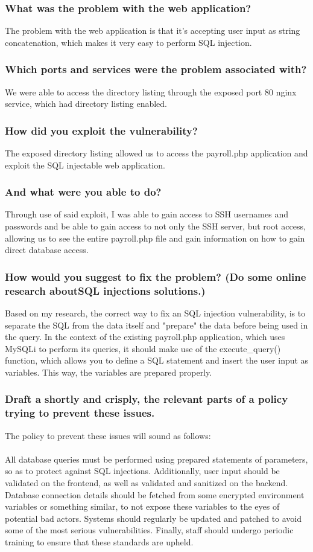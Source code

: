 \subsubsection{What was the problem with the web application?}
The problem with the web application is that it's accepting user input as string concatenation, which makes it very easy to perform SQL injection.
\subsubsection{Which ports and services were the problem associated with?}
We were able to access the directory listing through the exposed port 80 nginx service, which had directory listing enabled.
\subsubsection{How did you exploit the vulnerability?}
The exposed directory listing allowed us to access the payroll.php application and exploit the SQL injectable web application.
\subsubsection{And what were you able to do?}
Through use of said exploit, I was able to gain access to SSH usernames and passwords and be able to gain access to not only the SSH server, but root access, allowing us to see the entire payroll.php file and gain information on how to gain direct database access.
\subsubsection{How would you suggest to fix the problem? (Do some online research aboutSQL injections solutions.)}
Based on my research, the correct way to fix an SQL injection vulnerability, is to separate the SQL from the data itself and "prepare" the data before being used in the query. In the context of the existing payroll.php application, which uses MySQLi to perform its queries, it should make use of the execute\_query() function, which allows you to define a SQL statement and insert the user input as variables. This way, the variables are prepared properly.
\subsubsection{Draft a shortly and crisply, the relevant parts of a policy trying to prevent these issues.}
The policy to prevent these issues will sound as follows:
\\\\
All database queries must be performed using prepared statements of parameters, so as to protect against SQL injections. Additionally, user input should be validated on the frontend, as well as validated and sanitized on the backend. Database connection details should be fetched from some encrypted environment variables or something similar, to not expose these variables to the eyes of potential bad actors. Systems should regularly be updated and patched to avoid some of the most serious vulnerabilities. Finally, staff should undergo periodic training to ensure that these standards are upheld.

